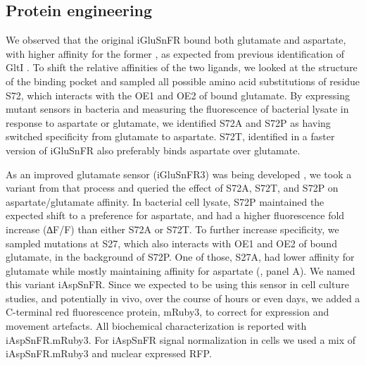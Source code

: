 \documentclass[9pt,lineno]{elife}
\begin{document}
\subsection{Protein engineering}
We observed that the original iGluSnFR bound both glutamate and aspartate, with higher affinity for the former \citep{Marvin2013-qq}, as expected from previous identification of GltI \citep{Hu2008-nd}.
To shift the relative affinities of the two ligands, we looked at the structure of the binding pocket and sampled all possible amino acid substitutions of residue S72, which interacts with the OE1 and OE2 of bound glutamate.
By expressing mutant sensors in bacteria and measuring the fluorescence of bacterial lysate in response to aspartate or glutamate, we identified S72A and S72P as having switched specificity from glutamate to aspartate.
S72T, identified in a faster version of iGluSnFR \citep{Helassa2018-fb} also preferably binds aspartate over glutamate.

As an improved glutamate sensor (iGluSnFR3) was being developed \citep{Aggarwal2023-pi}, we took a variant from that process and queried the effect of S72A, S72T, and S72P on aspartate/glutamate affinity.
In bacterial cell lysate, S72P maintained the expected shift to a preference for aspartate, and had a higher fluorescence fold increase (∆F/F) than either S72A or S72T.
To further increase specificity, we sampled mutations at S27, which also interacts with OE1 and OE2 of bound glutamate, in the background of S72P.
One of those, S27A, had lower affinity for glutamate while mostly maintaining affinity for aspartate (, panel A).
We named this variant iAspSnFR.
Since we expected to be using this sensor in cell culture studies, and potentially in vivo, over the course of hours or even days, we added a C-terminal red fluorescence protein, mRuby3, to correct for expression and movement artefacts.
All biochemical characterization is reported with iAspSnFR.mRuby3.
For iAspSnFR signal normalization in cells we used a mix of iAspSnFR.mRuby3 and nuclear expressed RFP.
\end{document}
